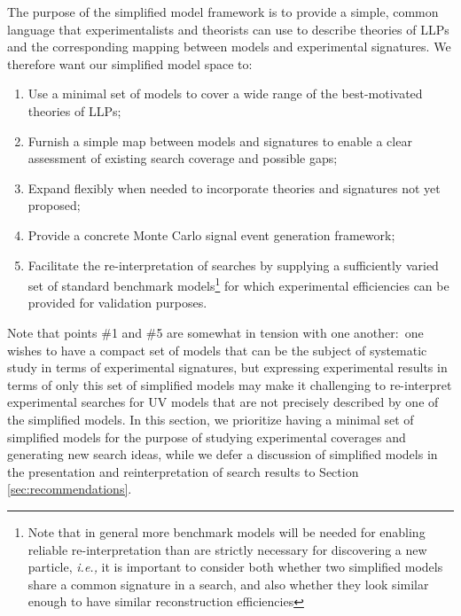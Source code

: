 The purpose of the simplified model framework is to provide a simple, common language that experimentalists and theorists can use to describe theories of LLPs and the corresponding mapping between models and experimental signatures. We therefore want our simplified model space to:
%
\begin{enumerate}
%
\item  Use a minimal set of models to cover a wide range of the best-motivated theories of LLPs;
\item  Furnish a simple map between models and signatures to enable a clear assessment of existing search coverage and possible gaps; %
\item Expand flexibly when needed to incorporate theories and signatures not yet proposed;
\item Provide a concrete Monte Carlo signal event generation framework;
\item Facilitate the re-interpretation of searches by supplying a sufficiently varied set of standard benchmark models\footnote{Note that  in general more benchmark models will be needed for enabling reliable re-interpretation than are strictly necessary for discovering a new particle, \emph{i.e.,}  it is important to consider both whether two simplified models share a common signature in a search, and also whether they look similar enough to have similar reconstruction efficiencies} for which experimental efficiencies can be provided for validation purposes.
\end{enumerate}
%
Note that points \#1 and \#5 are somewhat in tension with one another:~one wishes to have a compact set of models that can be the subject of systematic study in terms of experimental signatures, but expressing experimental results in terms of only this set of simplified models may make it challenging to re-interpret experimental searches for UV models that are not precisely described by one of the simplified models. In this section, we prioritize having a minimal set of simplified models for the purpose of studying experimental coverages and generating new search ideas, while we defer a discussion of simplified models in the presentation and reinterpretation of search results to Section \ref{sec:recommendations}.

